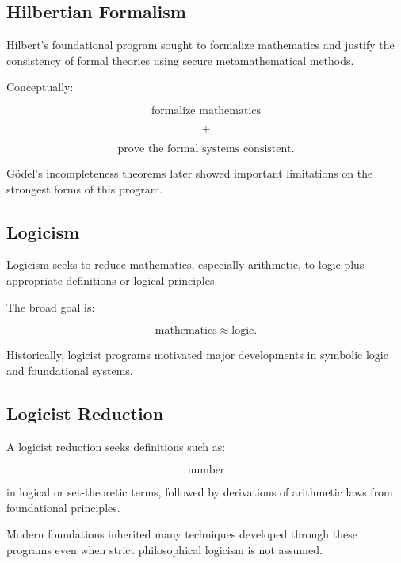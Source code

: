 \subsection{Hilbertian Formalism}
\label{subsec:hilbertian-formalism}

Hilbert's foundational program sought to formalize mathematics and justify
the consistency of formal theories using secure metamathematical methods.

Conceptually:

\[
\boxed{
\text{formalize mathematics}
}
\]

\[
\boxed{
+
}
\]

\[
\boxed{
\text{prove the formal systems consistent}.
}
\]

Gödel's incompleteness theorems later showed important limitations on the
strongest forms of this program.

\subsection{Logicism}
\label{subsec:logicism}

Logicism seeks to reduce mathematics, especially arithmetic, to logic plus
appropriate definitions or logical principles.

The broad goal is:

\[
\boxed{
\text{mathematics}
\approx
\text{logic}.
}
\]

Historically, logicist programs motivated major developments in symbolic
logic and foundational systems.

\subsection{Logicist Reduction}
\label{subsec:logicist-reduction}

A logicist reduction seeks definitions such as:

\[
\boxed{
\text{number}
}
\]

in logical or set-theoretic terms, followed by derivations of arithmetic
laws from foundational principles.

Modern foundations inherited many techniques developed through these
programs even when strict philosophical logicism is not assumed.

